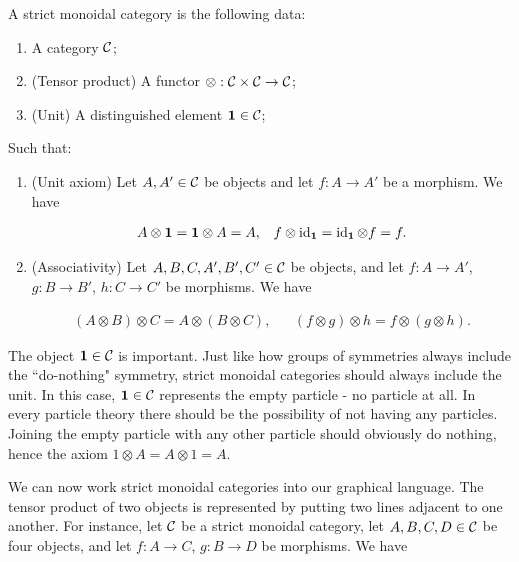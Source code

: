 \begin{defn} A strict monoidal category is the following data:

\begin{enumerate}
\item A category ${\mathcal C}$;
\item (Tensor product) A functor $\otimes: {\mathcal C} \times {\mathcal C} \to {\mathcal C}$;
\item (Unit) A distinguished element ${\mathbf 1}\in {\mathcal C}$;
\end{enumerate}

Such that:

\begin{enumerate}
\item (Unit axiom) Let $A,A'\in {\mathcal C}$ be objects and let $f:A\to A'$ be a morphism. We have

\begin{align*}
A\otimes {\mathbf 1} = {\mathbf 1} \otimes A =A, && f\otimes \operatorname{id}_{{\mathbf 1}} = \operatorname{id}_{{\mathbf 1}}\otimes f = f.
\end{align*}

\item (Associativity) Let $A,B,C,A',B',C'\in{\mathcal C}$ be objects, and let $f:A\to A'$, $g:B\to B'$, $h:C\to C'$ be morphisms. We have

\begin{align*}
(A\otimes B)\otimes C = A\otimes (B\otimes C), && (f\otimes g)\otimes h = f\otimes (g\otimes h).
\end{align*}
\end{enumerate}

\raggedleft\qedsymbol{}
\end{defn}

The object ${\mathbf 1}\in {\mathcal C}$ is important. Just like how groups of symmetries always include the ``do-nothing" symmetry, strict monoidal categories should always include the unit. In this case, ${\mathbf 1}\in {\mathcal C}$ represents the empty particle - no particle at all. In every particle theory there should be the possibility of not having any particles. Joining the empty particle with any other particle should obviously do nothing, hence the axiom $1\otimes A = A\otimes 1 = A$.

We can now work strict monoidal categories into our graphical language. The tensor product of two objects is represented by putting two lines adjacent to one another. For instance, let ${\mathcal C}$ be a strict monoidal category, let $A,B,C,D\in {\mathcal C}$ be four objects, and let $f:A\to C$, $g:B\to D$ be morphisms. We have


